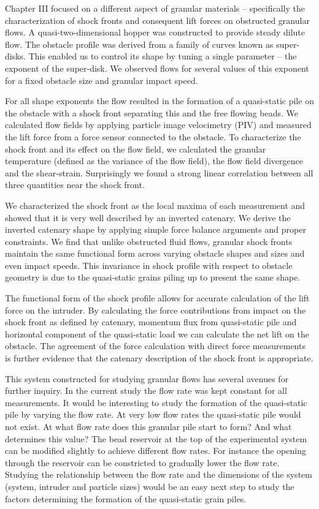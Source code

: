 Chapter III focused on a different aspect of granular materials – specifically the characterization of shock fronts and consequent lift forces on obstructed granular flows. A quasi-two-dimensional hopper was constructed to provide steady dilute flow. The obstacle profile was derived from a family of curves known as super-disks. This enabled us to control its shape by tuning a single parameter – the exponent of the super-disk. We observed flows for several values of this exponent for a fixed obstacle size and granular impact speed. 

For all shape exponents the flow resulted in the formation of a quasi-static pile on the obstacle with a shock front separating this and the free flowing beads. We calculated flow fields by applying particle image velocimetry (PIV) and measured the lift force from a force sensor connected to the obstacle. To characterize the shock front and its effect on the flow field, we calculated the granular temperature (defined as the variance of the flow field), the flow field divergence and the shear-strain. Surprisingly we found a strong linear correlation between all three quantities near the shock front. 

We characterized the shock front as the local maxima of each measurement and showed that it is very well described by an inverted catenary. We derive the inverted catenary shape by applying simple force balance arguments and proper constraints. We find that unlike obstructed fluid flows, granular shock fronts maintain the same functional form across varying obstacle shapes and sizes and even impact speeds. This invariance in shock profile with respect to obstacle geometry is due to the quasi-static grains piling up to present the same shape. 

The functional form of the shock profile allows for accurate calculation of the lift force on the intruder. By calculating the force contributions from impact on the shock front as defined by catenary, momentum flux from quasi-static pile and horizontal component of the quasi-static load we can calculate the net lift on the obstacle. The agreement of the force calculation with direct force measurements is further evidence that the catenary description of the shock front is appropriate. 

This system constructed for studying granular flows has several avenues for further inquiry. In the current study the flow rate was kept constant for all measurements. It would be interesting to study the formation of the quasi-static pile by varying the flow rate. At very low flow rates the quasi-static pile would not exist. At what flow rate does this granular pile start to form? And what determines this value? The bead reservoir at the top of the experimental system can be modified slightly to achieve different flow rates. For instance the opening through the reservoir can be constricted to gradually lower the flow rate. Studying the relationship between the flow rate and the dimensions of the system (system, intruder and particle sizes) would be an easy next step to study the factors determining the formation of the quasi-static grain piles.

